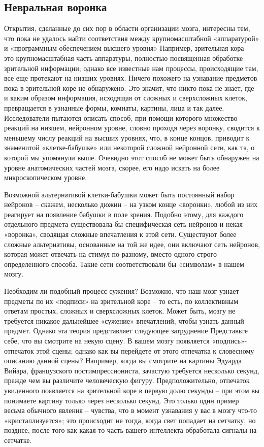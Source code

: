 \documentclass[../main.tex]{subfiles}
\begin{document}
\subsection{Невральная воронка}

Открытия, сделанные до сих пор в области организации мозга, интересны тем, что пока не удалось найти соответствия между крупномасштабной «аппаратурой» и «программным обеспечением высшего уровня» Например, зрительная кора \--- это крупномасштабная часть аппаратуры, полностью посвященная обработке зрительной информации; однако все известные нам процессы, происходящие там, все еще протекают на низших уровнях. Ничего похожего на узнавание предметов пока в зрительной коре не обнаружено. Это значит, что никто пока не знает, где и каким образом информация, исходящая от сложных и сверхсложных клеток, превращается в узнанные формы, комнаты, картины, лица и так далее. Исследователи пытаются описать способ, при помощи которого множество реакций на низшем, нейронном уровне, словно проходя через воронку, сводится к меньшему числу реакций на высших уровнях, что, в конце концов, приводит к знаменитой «клетке-бабушке» или некоторой сложной нейронной сети, как та, о которой мы упомянули выше. Очевидно этот способ не может быть обнаружен на уровне анатомических частей мозга, скорее, его надо искать на более микроскопическом уровне.

Возможной альтернативой клетки-бабушки может быть постоянный набор нейронов \--- скажем, несколько дюжин \--- на узком конце «воронки», любой из них реагирует на появление бабушки в поле зрения. Подобно этому, для каждого отдельного предмета существовала бы специфическая сеть нейронов и некая «воронка», сводящая сложные впечатления к этой сети. Существуют более сложные альтернативы, основанные на той же идее, они включают сеть нейронов, которая может отвечать на стимул по-разному, вместо одного строго определенного способа. Такие сети соответствовали бы «символам» в нашем мозгу.

Необходим ли подобный процесс сужения? Возможно, что наш мозг узнает предметы по их «подписи» на зрительной коре \--- то есть, по коллективным ответам простых, сложных и сверхсложных клеток. Может быть, мозгу не требуется никакое дальнейшее «сужение» впечатлений, чтобы узнать данный предмет. Однако эта теория представляет следующее затруднение Представьте себе, что вы смотрите на некую сцену. В вашем мозгу появляется «подпись»-отпечаток этой сцены; однако как вы перейдете от этого отпечатка к словесному описанию данной сцены? Например, когда вы смотрите на картины Эдуарда Вийара, французского постимпрессиониста, зачастую требуется несколько секунд, прежде чем вы различите человеческую фигуру. Предположительно, отпечаток увиденного появляется на зрительной коре в первую долю секунды \--- при этом вы понимаете картину только через несколько секунд. Это только один пример весьма обычного явления \--- чувства, что в момент узнавания у вас в мозгу что-то «кристаллизуется»; это происходит не тогда, когда свет попадает на сетчатку, но позднее, после того как какая-то часть вашего интеллекта обработала сигналы на сетчатке.
\end{document}
